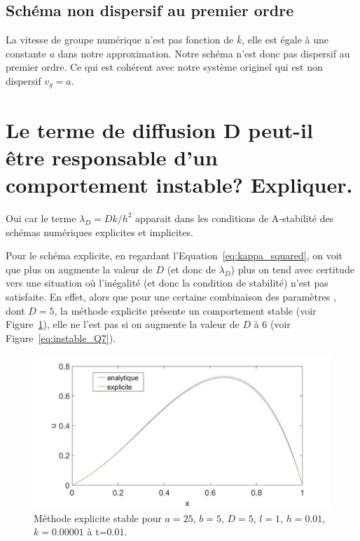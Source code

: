 \documentclass[a4paper, 12pt]{report}
\begin{document}
\subsection*{Schéma non dispersif au premier ordre}

La vitesse de groupe numérique n'est pas fonction de $\bar{k}$,
elle est égale à une constante $a$ dans notre approximation.
Notre schéma n'est donc pas dispersif au premier ordre.
Ce qui est cohérent avec notre système originel qui est non dispersif $v_{g} = a $.


\section{Le terme de diffusion D peut-il être responsable d'un comportement instable? Expliquer.}

Oui car le terme $\lambda_D  = Dk /h^2$ apparait dans les conditions de A-stabilité
des schémas numériques explicites et implicites.

Pour le schéma explicite,
en regardant l'Equation~\ref{eq:kappa_squared}, on voit que plus on augmente
la valeur de $D$ (et donc de $\lambda_D$) plus on tend avec certitude vers
une situation où l'inégalité (et donc la condition de stabilité) n'est pas
satisfaite. En effet, alors que pour une certaine combinaison des paramètres
, dont $D=5$, la méthode explicite présente un comportement stable (voir
Figure~\ref{eq:stable_Q7}), elle ne l'est pas si on augmente la valeur de $D$ à $6$
(voir Figure~\ref{eq:instable_Q7}).

\begin{figure}[H]
  \center
  \includegraphics[scale=0.4]{images/q7D5stable.jpg}
  \caption{Méthode explicite stable pour $a=25$, $b=5$, $D=5$,
  $l=1$, $h=0.01$, $k = 0.00001$ à t=$0.01$.}
  \label{eq:stable_Q7}
\end{figure}
\end{document}
